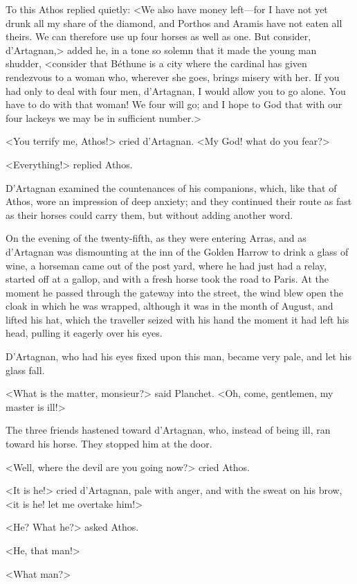 To this Athos replied quietly: <We also have money left---for I have not yet drunk all my share of the diamond, and Porthos and Aramis have not eaten all theirs. We can therefore use up four horses as well as one. But consider, d'Artagnan,> added he, in a tone so solemn that it made the young man shudder, <consider that Béthune is a city where the cardinal has given rendezvous to a woman who, wherever she goes, brings misery with her. If you had only to deal with four men, d'Artagnan, I would allow you to go alone. You have to do with that woman! We four will go; and I hope to God that with our four lackeys we may be in sufficient number.> 

<You terrify me, Athos!> cried d'Artagnan. <My God! what do you fear?> 

<Everything!> replied Athos. 

D'Artagnan examined the countenances of his companions, which, like that of Athos, wore an impression of deep anxiety; and they continued their route as fast as their horses could carry them, but without adding another word. 

On the evening of the twenty-fifth, as they were entering Arras, and as d'Artagnan was dismounting at the inn of the Golden Harrow to drink a glass of wine, a horseman came out of the post yard, where he had just had a relay, started off at a gallop, and with a fresh horse took the road to Paris. At the moment he passed through the gateway into the street, the wind blew open the cloak in which he was wrapped, although it was in the month of August, and lifted his hat, which the traveller seized with his hand the moment it had left his head, pulling it eagerly over his eyes. 

D'Artagnan, who had his eyes fixed upon this man, became very pale, and let his glass fall. 

<What is the matter, monsieur?> said Planchet. <Oh, come, gentlemen, my master is ill!> 

The three friends hastened toward d'Artagnan, who, instead of being ill, ran toward his horse. They stopped him at the door. 

<Well, where the devil are you going now?> cried Athos. 

<It is he!> cried d'Artagnan, pale with anger, and with the sweat on his brow, <it is he! let me overtake him!> 

<He? What he?> asked Athos. 

<He, that man!> 

<What man?> 

